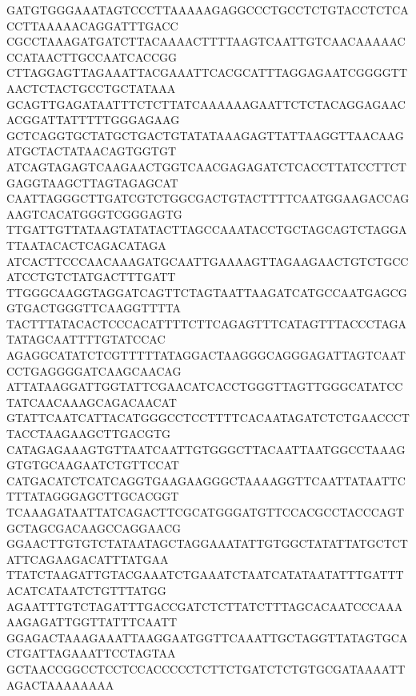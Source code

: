 GATGTGGGAAATAGTCCCTTAAAAAGAGGCCCTGCCTCTGTACCTCTCACCTTAAAAACAGGATTTGACC
CGCCTAAAGATGATCTTACAAAACTTTTAAGTCAATTGTCAACAAAAACCCATAACTTGCCAATCACCGG
CTTAGGAGTTAGAAATTACGAAATTCACGCATTTAGGAGAATCGGGGTTAACTCTACTGCCTGCTATAAA
GCAGTTGAGATAATTTCTCTTATCAAAAAAGAATTCTCTACAGGAGAACACGGATTATTTTTGGGAGAAG
GCTCAGGTGCTATGCTGACTGTATATAAAGAGTTATTAAGGTTAACAAGATGCTACTATAACAGTGGTGT
ATCAGTAGAGTCAAGAACTGGTCAACGAGAGATCTCACCTTATCCTTCTGAGGTAAGCTTAGTAGAGCAT
CAATTAGGGCTTGATCGTCTGGCGACTGTACTTTTCAATGGAAGACCAGAAGTCACATGGGTCGGGAGTG
TTGATTGTTATAAGTATATACTTAGCCAAATACCTGCTAGCAGTCTAGGATTAATACACTCAGACATAGA
ATCACTTCCCAACAAAGATGCAATTGAAAAGTTAGAAGAACTGTCTGCCATCCTGTCTATGACTTTGATT
TTGGGCAAGGTAGGATCAGTTCTAGTAATTAAGATCATGCCAATGAGCGGTGACTGGGTTCAAGGTTTTA
TACTTTATACACTCCCACATTTTCTTCAGAGTTTCATAGTTTACCCTAGATATAGCAATTTTGTATCCAC
AGAGGCATATCTCGTTTTTATAGGACTAAGGGCAGGGAGATTAGTCAATCCTGAGGGGATCAAGCAACAG
ATTATAAGGATTGGTATTCGAACATCACCTGGGTTAGTTGGGCATATCCTATCAACAAAGCAGACAACAT
GTATTCAATCATTACATGGGCCTCCTTTTCACAATAGATCTCTGAACCCTTACCTAAGAAGCTTGACGTG
CATAGAGAAAGTGTTAATCAATTGTGGGCTTACAATTAATGGCCTAAAGGTGTGCAAGAATCTGTTCCAT
CATGACATCTCATCAGGTGAAGAAGGGCTAAAAGGTTCAATTATAATTCTTTATAGGGAGCTTGCACGGT
TCAAAGATAATTATCAGACTTCGCATGGGATGTTCCACGCCTACCCAGTGCTAGCGACAAGCCAGGAACG
GGAACTTGTGTCTATAATAGCTAGGAAATATTGTGGCTATATTATGCTCTATTCAGAAGACATTTATGAA
TTATCTAAGATTGTACGAAATCTGAAATCTAATCATATAATATTTGATTTACATCATAATCTGTTTATGG
AGAATTTGTCTAGATTTGACCGATCTCTTATCTTTAGCACAATCCCAAAAAGAGATTGGTTATTTCAATT
GGAGACTAAAGAAATTAAGGAATGGTTCAAATTGCTAGGTTATAGTGCACTGATTAGAAATTCCTAGTAA
GCTAACCGGCCTCCTCCACCCCCTCTTCTGATCTCTGTGCGATAAAATTAGACTAAAAAAAA


